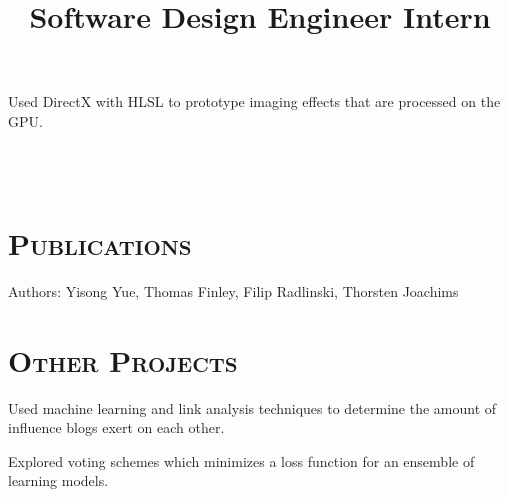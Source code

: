\begin{resume}
\title{Software Design Engineer Intern}
\begin{position}
Used DirectX with HLSL to prototype imaging effects that are
processed on the GPU.
\end{position}




\begin{formatb}
  \\
  \body\\
\end{formatb}

\section{\textsc{Publications}}

\begin{position}
Authors: Yisong Yue, Thomas Finley, Filip Radlinski, Thorsten Joachims
\end{position}

\section{\textsc{Other Projects}}

\begin{position}
Used machine learning and link analysis techniques to determine the amount of influence blogs exert on each other.
\end{position}

\begin{position}
Explored voting schemes which minimizes a loss function for an ensemble of learning models. 
\end{position}


\end{resume}
